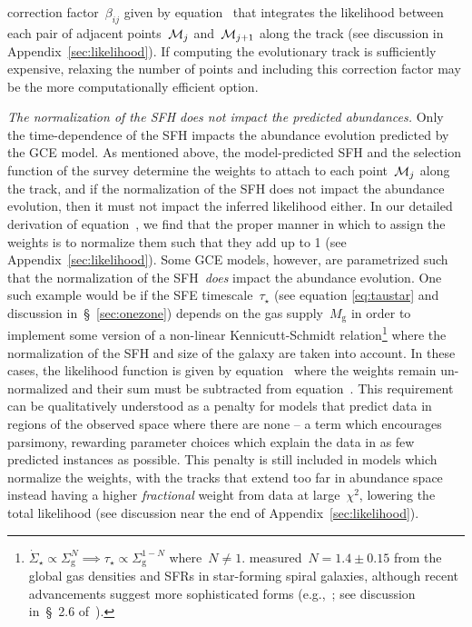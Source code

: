 \documentclass[foo.tex]{subfiles}
\begin{document}
correction factor~$\beta_{ij}$ given by equation~
that integrates the likelihood between each pair of adjacent
points~$\mathcal{M}_j$ and~$\mathcal{M}_{j + 1}$ along the track (see discussion
in Appendix~\ref{sec:likelihood}).
If computing the evolutionary track is sufficiently expensive, relaxing the
number of points and including this correction factor may be the more
computationally efficient option.
\par
\textit{The normalization of the SFH does not impact the predicted abundances.}
Only the time-dependence of the SFH impacts the abundance evolution predicted
by the GCE model.
As mentioned above, the model-predicted SFH and the selection function of the
survey determine the weights to attach to each point~$\mathcal{M}_j$ along the
track, and if the normalization of the SFH does not impact the abundance
evolution, then it must not impact the inferred likelihood either.
In our detailed derivation of equation~, we find that the
proper manner in which to assign the weights is to normalize them such that
they add up to 1 (see Appendix~\ref{sec:likelihood}).
Some GCE models, however, are parametrized such that the normalization of the
SFH~\textit{does} impact the abundance evolution.
One such example would be if the SFE timescale~$\tau_\star$ (see equation
\ref{eq:taustar} and discussion in~\S~\ref{sec:onezone}) depends on the gas
supply~$M_\text{g}$ in order to implement some version of a non-linear
Kennicutt-Schmidt relation\footnote{
	$\dot{\Sigma}_\star \propto \Sigma_\text{g}^N \implies \tau_\star \propto
	\Sigma_\text{g}^{1 - N}$ where~$N \neq 1$.
	\citet{Kennicutt1998} measured~$N = 1.4 \pm 0.15$ from the global gas
	densities and SFRs in star-forming spiral galaxies, although recent
	advancements suggest more sophisticated forms (e.g.,~\citealp{Krumholz2018};
	see discussion in~\S~2.6 of~\citealt{Johnson2021}).
} where the normalization of the SFH and size of the galaxy are taken into
account.
In these cases, the likelihood function is given by
equation~ where the weights remain un-normalized and
their sum must be subtracted from equation~.
This requirement can be qualitatively understood as a penalty for models that
predict data in regions of the observed space where there are none -- a term
which encourages parsimony, rewarding parameter choices which explain the data
in as few predicted instances as possible.
This penalty is still included in models which normalize the weights, with the
tracks that extend too far in abundance space instead having a higher
\textit{fractional} weight from data at large~$\chi^2$, lowering the total
likelihood (see discussion near the end of Appendix~\ref{sec:likelihood}).
\end{document}
